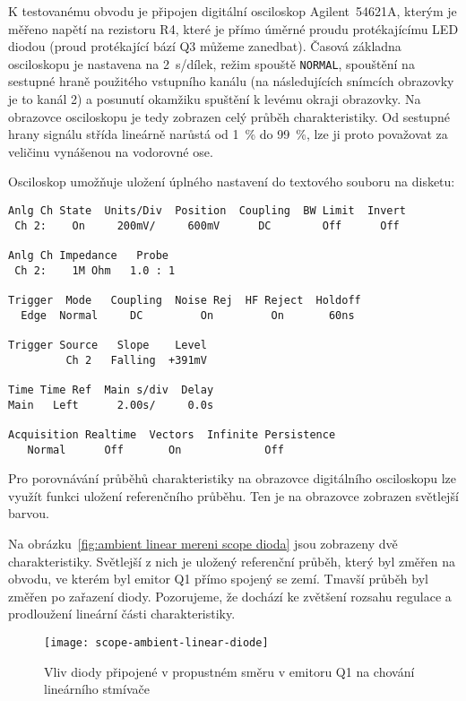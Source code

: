 K testovanému obvodu je připojen digitální osciloskop Agilent~54621A, kterým je
měřeno napětí na rezistoru R4, které je přímo úměrné proudu protékajícímu LED
diodou (proud protékající bází Q3 můžeme zanedbat). Časová základna osciloskopu
je nastavena na \SI{2}{\second}/dílek, režim spouště \texttt{NORMAL}, spouštění
na sestupné hraně použitého vstupního kanálu (na následujících snímcích
obrazovky je to kanál 2) a posunutí okamžiku spuštění k levému okraji
obrazovky. Na obrazovce osciloskopu je tedy zobrazen celý průběh
charakteristiky. Od sestupné hrany signálu střída lineárně narůstá od
\SI{1}{\percent} do \SI{99}{\percent}, lze ji proto považovat za veličinu
vynášenou na vodorovné ose.

Osciloskop umožňuje uložení úplného nastavení do textového souboru na disketu:
\begin{lstlisting}[style=terminal]
Anlg Ch State  Units/Div  Position  Coupling  BW Limit  Invert
 Ch 2:    On     200mV/     600mV      DC        Off      Off

Anlg Ch Impedance   Probe
 Ch 2:    1M Ohm   1.0 : 1

Trigger  Mode   Coupling  Noise Rej  HF Reject  Holdoff
  Edge  Normal     DC         On         On       60ns

Trigger Source   Slope    Level
         Ch 2   Falling  +391mV

Time Time Ref  Main s/div  Delay
Main   Left      2.00s/     0.0s

Acquisition Realtime  Vectors  Infinite Persistence
   Normal      Off       On             Off
\end{lstlisting}

Pro porovnávání průběhů charakteristiky na obrazovce digitálního osciloskopu
lze využít funkci uložení referenčního průběhu. Ten je na obrazovce zobrazen
světlejší barvou.

Na obrázku~\vref{fig:ambient linear mereni scope dioda} jsou zobrazeny dvě
charakteristiky. Světlejší z nich je uložený referenční průběh, který byl
změřen na obvodu, ve kterém byl emitor Q1 přímo spojený se zemí. Tmavší průběh
byl změřen po zařazení diody. Pozorujeme, že dochází ke zvětšení rozsahu
regulace a prodloužení lineární části charakteristiky.

\begin{figure}[htbp]
    \centering
    \texttt{[image: scope-ambient-linear-diode]}
    \caption{%
        Vliv diody připojené v propustném směru v emitoru Q1 na chování
        lineárního stmívače
    }
    \label{fig:ambient linear mereni scope dioda}
\end{figure}

